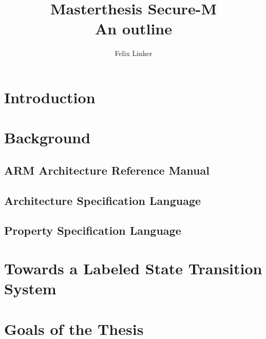 \documentclass{securem}
\title{Masterthesis Secure-M \\ \large{An outline}}
\author{Felix Linker}
\date{}
\begin{document}
\maketitle

\section{Introduction}

\section{Background}

\subsection{ARM Architecture Reference Manual}

\subsection{Architecture Specification Language}

\subsection{Property Specification Language}

\section{Towards a Labeled State Transition System}

\section{Goals of the Thesis}



\end{document}
